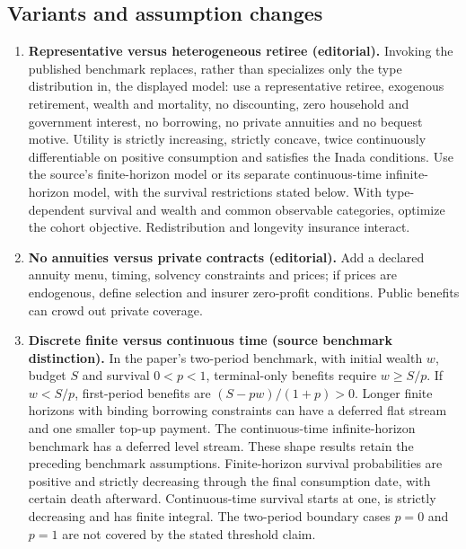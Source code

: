 \documentclass[11pt,a4paper]{article}
\begin{document}
\subsection*{Variants and assumption changes}
\begin{enumerate}
\item \textbf{Representative versus heterogeneous retiree (editorial).} Invoking the published benchmark replaces, rather than specializes only the type distribution in, the displayed model: use a representative retiree, exogenous retirement, wealth and mortality, no discounting, zero household and government interest, no borrowing, no private annuities and no bequest motive. Utility is strictly increasing, strictly concave, twice continuously differentiable on positive consumption and satisfies the Inada conditions. Use the source's finite-horizon model or its separate continuous-time infinite-horizon model, with the survival restrictions stated below. With type-dependent survival and wealth and common observable categories, optimize the cohort objective. Redistribution and longevity insurance interact.
\item \textbf{No annuities versus private contracts (editorial).} Add a declared annuity menu, timing, solvency constraints and prices; if prices are endogenous, define selection and insurer zero-profit conditions. Public benefits can crowd out private coverage.
\item \textbf{Discrete finite versus continuous time (source benchmark distinction).} In the paper's two-period benchmark, with initial wealth \(w\), budget \(S\) and survival \(0<p<1\), terminal-only benefits require \(w\geq S/p\). If \(w<S/p\), first-period benefits are \((S-pw)/(1+p)>0\). Longer finite horizons with binding borrowing constraints can have a deferred flat stream and one smaller top-up payment. The continuous-time infinite-horizon benchmark has a deferred level stream. These shape results retain the preceding benchmark assumptions. Finite-horizon survival probabilities are positive and strictly decreasing through the final consumption date, with certain death afterward. Continuous-time survival starts at one, is strictly decreasing and has finite integral. The two-period boundary cases \(p=0\) and \(p=1\) are not covered by the stated threshold claim.
\end{enumerate}
\end{document}
